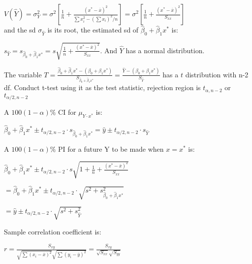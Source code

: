 \documentclass{article}
\begin{document}
	$V ( \hat { Y } ) = \sigma _ { Y } ^ { 2 } = \sigma ^ { 2 } \left[ \frac { 1 } { n } + \frac { \left( x ^ { * } - \overline { x } \right) ^ { 2 } } { \sum x _ { i } ^ { 2 } - \left( \sum x _ { i } \right) ^ { 2 } / n } \right] = \sigma ^ { 2 } \left[ \frac { 1 } { n } + \frac { \left( x ^ { * } - \overline { x } \right) ^ { 2 } } { S _ { x x } } \right]$\\
	and the sd $\sigma_{\hat{ Y }}$ is its root, the estimated sd of $\hat { \beta } _ { 0 } + \hat { \beta } _ { 1 } x ^ { * }$ is:
	
	$s _ { \hat { Y } } = s _ { \hat { \beta } _ { 0 } + \hat { \beta } _ { 1 } x ^ { * } } = s \sqrt { \frac { 1 } { n } + \frac { \left( x ^ { * } - \overline { x } \right) ^ { 2 } } { S _ { x x } } }$. And $\hat{ Y }$ has a normal distribution.
	
	The variable $T = \frac { \hat { \beta } _ { 0 } + \hat { \beta } _ { 1 } x ^ { * } - \left( \beta _ { 0 }
		+ \beta _ { 1 } x ^ { * } \right) } { S _ { \hat { \beta } _ { 0 } + \hat { \beta } _ { 1 } x ^ { * } }  }
	= \frac { \hat { Y } - \left( \beta _ { 0 } + \beta _ { 1 } x ^ { * } \right) } { S _ { \hat{Y} } }$ has a $t$ distribution with n-2 df. Conduct t-test using it as the test statistic, rejection region is $t_{\alpha,n-2}$ or $t_{\alpha/2,n-2
	}$
	
	A $100(1-\alpha)\%$ CI for $\mu_{Y\cdot x^*}$ is:
	
	$\hat { \beta } _ { 0 } + \hat { \beta } _ { 1 } x ^ { * } \pm t _ { \alpha / 2 , n - 2 } \cdot s_{\hat { \beta } _ {  0  } + \hat { \beta } _ { 1 } x ^ { * }} = \hat { y } \pm t _ { \alpha / 2 , n - 2 } \cdot s _ { \hat { Y } }$
	
	\noindent
	A $100(1-\alpha)\%$ PI for a future Y to be made when $x=x^*$ is:
	
	$\hat { \beta } _ { 0 } + \hat { \beta } _ { 1 } x ^ { * } \pm t _ { \alpha / 2 , n - 2 } \cdot s \sqrt { 1 + \frac { 1 } { n } + \frac { \left( x ^ { * } - \overline { x } \right) ^ { 2 } } { S _ { x x } } }$
	
	$= \hat { \beta } _ { 0 } + \hat { \beta } _ { 1 } x ^ { * } \pm t _ { \alpha / 2 , n - 2 } \cdot \sqrt { s ^ { 2 } + s ^ 2 _ { \hat { \beta } _ { 0 } + \hat { \beta } _ { 1 } x ^ { * } } }$
	
	$ = \hat { y } \pm t _ { \alpha / 2 , n - 2 } \cdot \sqrt { s ^ { 2 } + s _ { \hat { Y } } ^ { 2 } }$
	
	
	Sample correlation coefficient is: 
	
	$r = \frac { S _ { x y } } { \sqrt { \sum \left( x _ { i } - \overline { x } \right) ^ { 2 } } \sqrt { \sum \left( y _ { i } - \overline { y } \right) ^ { 2 } } } = \frac { S _ { x y } } { \sqrt { S _ { x x } } \sqrt { S _ { y y } } }$
	
\end{document}
